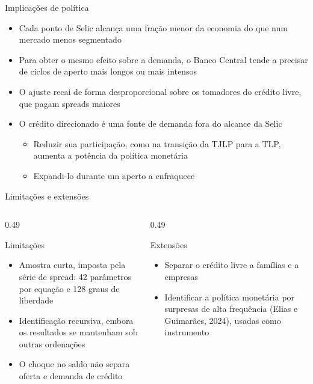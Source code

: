 \documentclass[11pt,aspectratio=169]{beamer}
\begin{document}
\begin{frame}{Implicações de política}
  \begin{itemize}
    \item Cada ponto de Selic alcança uma \alert{fração menor} da economia do que num mercado menos segmentado
    \item Para obter o mesmo efeito sobre a demanda, o Banco Central tende a precisar de ciclos de aperto \alert{mais longos ou mais intensos}
    \item O ajuste recai de forma desproporcional sobre os \alert{tomadores do crédito livre}, que pagam spreads maiores
    \item O crédito direcionado é uma fonte de demanda \alert{fora do alcance da Selic}
    \begin{itemize}
      \item Reduzir sua participação, como na transição da TJLP para a TLP, aumenta a potência da política monetária
      \item Expandi-lo durante um aperto a enfraquece
    \end{itemize}
  \end{itemize}
\end{frame}

\begin{frame}{Limitações e extensões}
  \begin{columns}[T]
    \begin{column}{0.49\textwidth}
      \begin{block}{Limitações}
        \small
        \begin{itemize}
          \item Amostra curta, imposta pela série de spread: 42 parâmetros por equação e 128 graus de liberdade
          \item Identificação recursiva, embora os resultados se mantenham sob outras ordenações
          \item O choque no saldo não separa oferta e demanda de crédito
        \end{itemize}
      \end{block}
    \end{column}
    \begin{column}{0.49\textwidth}
      \begin{block}{Extensões}
        \small
        \begin{itemize}
          \item Separar o crédito livre a famílias e a empresas
          \item Identificar a política monetária por surpresas de alta frequência (Elias e Guimarães, 2024), usadas como instrumento
        \end{itemize}
      \end{block}
    \end{column}
  \end{columns}
\end{frame}
\end{document}
